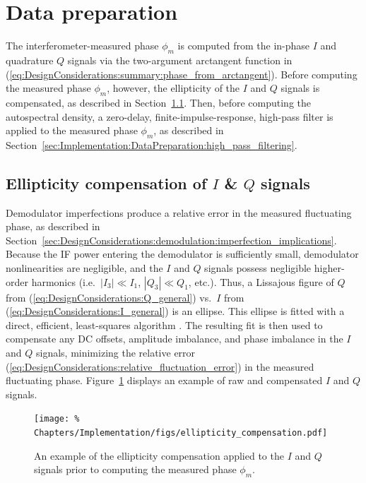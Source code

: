 \section{Data preparation}
\label{sec:Implementation:DataPreparation}
The interferometer-measured phase $\phi_m$
is computed from the in-phase $I$ and quadrature $Q$ signals
via the two-argument arctangent function in
(\ref{eq:DesignConsiderations:summary:phase_from_arctangent}).
Before computing the measured phase $\phi_m$, however,
the ellipticity of the $I$ and $Q$ signals is compensated, as described in
Section~\ref{sec:Implementation:DataPreparation:ellipticity_compensation}.
Then, before computing the autospectral density,
a zero-delay, finite-impulse-response, high-pass filter
is applied to the measured phase $\phi_m$, as described in
Section~\ref{sec:Implementation:DataPreparation:high_pass_filtering}.


\subsection{Ellipticity compensation of $I$ \& $Q$ signals}
\label{sec:Implementation:DataPreparation:ellipticity_compensation}
Demodulator imperfections produce a relative error
in the measured fluctuating phase, as described in
Section~\ref{sec:DesignConsiderations:demodulation:imperfection_implications}.
Because the IF power entering the demodulator is sufficiently small,
demodulator nonlinearities are negligible, and
the $I$ and $Q$ signals possess negligible higher-order harmonics
(i.e.\ $|I_3| \ll I_1$, $|Q_3| \ll Q_1$, etc.).
Thus, a Lissajous figure of $Q$ from
(\ref{eq:DesignConsiderations:Q_general})
vs.\ $I$ from (\ref{eq:DesignConsiderations:I_general})
is an ellipse.
This ellipse is fitted with a direct, efficient, least-squares algorithm
\cite{fitzgibbon_ieee99,vanforeest_ellipse_fitting}.
The resulting fit is then used to compensate
any DC offsets, amplitude imbalance, and phase imbalance
in the $I$ and $Q$ signals,
minimizing the relative error
(\ref{eq:DesignConsiderations:relative_fluctuation_error})
in the measured fluctuating phase.
Figure~\ref{fig:Implementation:ellipticity_compensation}
displays an example of raw and compensated $I$ and $Q$ signals.

\begin{figure}
  \centering
  \texttt{[image: \%
    Chapters/Implementation/figs/ellipticity\_compensation.pdf]}
  \caption[Ellipticity compensation of the $I$ and $Q$ signals]{%
    An example of the ellipticity compensation
    applied to the $I$ and $Q$ signals
    prior to computing the measured phase $\phi_m$.
  }
\label{fig:Implementation:ellipticity_compensation}
\end{figure}


